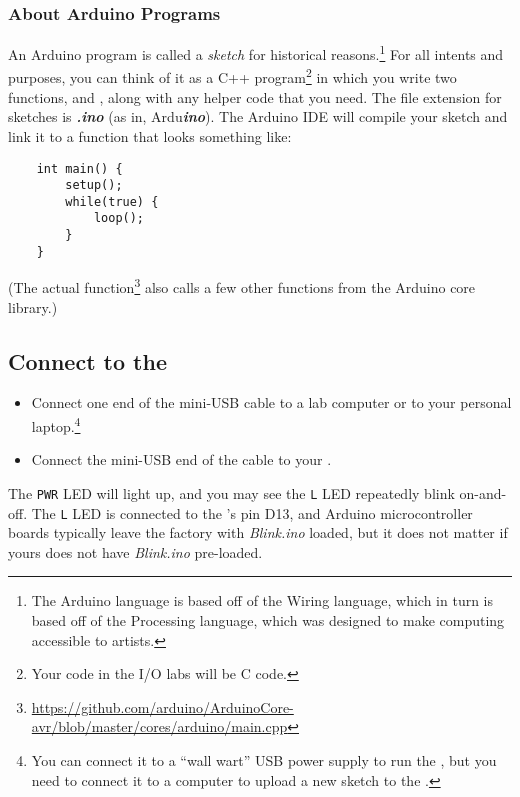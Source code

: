 \subsubsection*{About Arduino Programs}

    An Arduino program is called a \textit{sketch} for historical reasons.\footnote{The Arduino language is based off of the Wiring language, which in turn is based off of the Processing language, which was designed to make computing accessible to artists.}
    For all intents and purposes, you can think of it as a C++ program\footnote{Your code in the I/O labs will be C code.} in which you write two functions,  and , along with any helper code that you need.
    The file extension for sketches is \textbf{\textit{.ino}} (as in, Ardu\textbf{\textit{ino}}).
    The Arduino IDE will compile your sketch and link it to a  function that looks something like:
    \begin{lstlisting}
    int main() {
        setup();
        while(true) {
            loop();
        }
    }
    \end{lstlisting}
    (The actual  function\footnote{\url{https://github.com/arduino/ArduinoCore-avr/blob/master/cores/arduino/main.cpp}} also calls a few other functions from the Arduino core library.)

\subsection{Connect to the \developmentboard}

    \begin{itemize}
        \item Connect one end of the mini-USB cable to a lab computer or to your personal laptop.\footnote{You can connect it to a ``wall wart'' USB power supply to run the \developmentboard, but you need to connect it to a computer to upload a new sketch to the \developmentboard.}
        \item Connect the mini-USB end of the cable to your \developmentboard.
    \end{itemize}
    The \texttt{PWR} LED will light up, and you may see the \texttt{L} LED repeatedly blink on-and-off.
    The \texttt{L} LED is connected to the \developmentboard's pin D13, and Arduino microcontroller boards typically leave the factory with \textit{Blink.ino} loaded, but it does not matter if yours does not have \textit{Blink.ino} pre-loaded.

